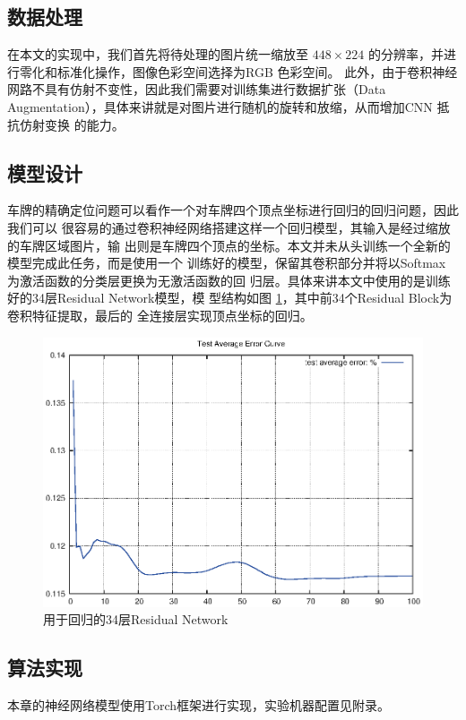 \subsection{数据处理}

在本文的实现中，我们首先将待处理的图片统一缩放至 $448 \times 224$ 的分辨率，并进
行零化和标准化操作，图像色彩空间选择为RGB 色彩空间。
此外，由于卷积神经网路不具有仿射不变性，因此我们需要对训练集进行数据扩张（Data
Augmentation），具体来讲就是对图片进行随机的旋转和放缩，从而增加CNN 抵抗仿射变换
的能力。

\subsection{模型设计}

车牌的精确定位问题可以看作一个对车牌四个顶点坐标进行回归的回归问题，因此我们可以
很容易的通过卷积神经网络搭建这样一个回归模型，其输入是经过缩放的车牌区域图片，输
出则是车牌四个顶点的坐标。本文并未从头训练一个全新的模型完成此任务，而是使用一个
训练好的模型，保留其卷积部分并将以Softmax 为激活函数的分类层更换为无激活函数的回
归层。具体来讲本文中使用的是训练好的34层Residual Network\cite{He:2015tt}模型，模
型结构如图 \ref{Fig:ResNet34Reg}，其中前34个Residual Block为卷积特征提取，最后的
全连接层实现顶点坐标的回归。

\begin{figure}[ht]
  \centering
  \includegraphics[width=0.8\linewidth]{./Figure/ResNet34Reg.eps}
  \caption{用于回归的34层Residual Network}\label{Fig:ResNet34Reg}
\end{figure}

\subsection{算法实现}

本章的神经网络模型使用Torch框架进行实现，实验机器配置见附录。

